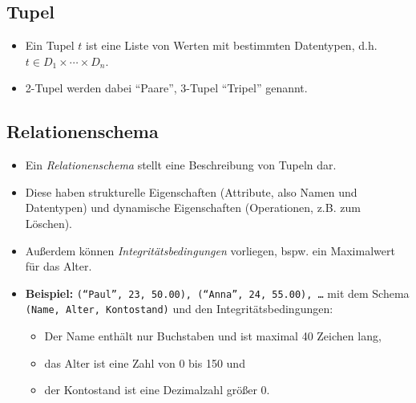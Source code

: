         \subsection{Tupel} %
            \begin{itemize}
            	\item Ein Tupel \(t\) ist eine Liste von Werten mit bestimmten Datentypen, d.h. \( t \in D _ 1 \times \cdots \times D _ n \).
            	\item 2-Tupel werden dabei \enquote{Paare}, 3-Tupel \enquote{Tripel} genannt.
            \end{itemize}

        \subsection{Relationenschema} %
            \begin{itemize}
            	\item Ein \textit{Relationenschema} stellt eine Beschreibung von Tupeln dar.
            	\item Diese haben strukturelle Eigenschaften (Attribute, also Namen und Datentypen) und dynamische Eigenschaften (Operationen, z.B. zum Löschen).
            	\item Außerdem können \textit{Integritätsbedingungen} vorliegen, bspw. ein Maximalwert für das Alter.
            	\item \textbf{Beispiel:} \texttt{(\enquote{Paul}, 23, 50.00), (\enquote{Anna}, 24, 55.00), \dots} mit dem Schema \texttt{(Name, Alter, Kontostand)} und den Integritätsbedingungen:
            		\begin{itemize}
            			\item Der Name enthält nur Buchstaben und ist maximal 40 Zeichen lang,
            			\item das Alter ist eine Zahl von 0 bis 150 und
            			\item der Kontostand ist eine Dezimalzahl größer 0.
            		\end{itemize}
            \end{itemize}

